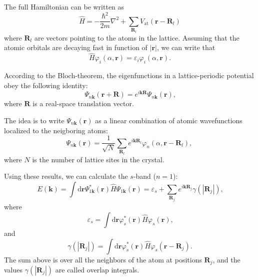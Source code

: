\documentclass[11pt, a4paper, twocolumn]{article}
\newcommand{\bb}[1]{\mathbf{#1}}
\newcommand{\dd}{\mathrm{d}}
\begin{document}
The full Hamiltonian can be written as
\begin{equation*}
  \hat H = -\frac{\hbar^2}{2m} \nabla^2 + \sum\limits_{\bb{R}_l} V_{\textrm{at}} (\bb r - \bb{R}_l)
\end{equation*}
where $\bb{R}_l$ are vectors pointing to the atoms in the lattice. Assuming that the atomic orbitals are
decaying fast in function of $|\bb r|$, we can write that 
\begin{equation*}
  \hat H \varphi_i(\alpha, \bb r) = \varepsilon_i \varphi_i(\alpha, \bb r) \textrm{.}
\end{equation*}

\par According to the Bloch-theorem, the eigenfunctions in a lattice-periodic potential obey the following identity:
\begin{equation*}
  \Psi_{n\bb k}(\bb r + \bb R) = e^{i\bb k \bb R}\Psi_{n\bb k}(\bb r) \text{,}
\end{equation*}
where $\bb R$ is a real-space translation vector. 
\par The idea is to write $\Psi_{n\bb k}(\bb r)$ as a linear combination of atomic wavefunctions localized to the neigboring atoms:
\begin{equation*}
  \Psi_{n\bb k}(\bb r) = \frac{1}{\sqrt N} \sum\limits_{\bb R_l} e^{i\bb k \bb R_l}\varphi_n(\alpha, \bb r - \bb R_l) \textrm{, }
\end{equation*}
where $N$ is the number of lattice sites in the crystal.

\par Using these results, we can calculate the $s$-band ($n=1$):
\begin{equation*}
  E(\bb k) = \int\dd\bb r \Psi_{1\bb k}^{*}(\bb r) \hat H \Psi_{1\bb k}(\bb r) = 
  \varepsilon_s + \sum\limits_{\bb R_j}e^{i\bb k \bb R_j}\gamma(|\bb R_j|) \textrm{,}
\end{equation*} 
where 
\begin{equation*}
  \varepsilon_s = \int\dd\bb r \varphi_{s}^{*}(\bb r) \hat H \varphi_{s}(\bb r) \textrm{,}
\end{equation*}
and 
\begin{equation*}
  \gamma(|\bb R_j|) = \int\dd \bb r \varphi_s^{*}(\bb r)\hat H\varphi_s(\bb r - \bb R_j) \textrm{.}
\end{equation*}
The sum above is over all the neighbors of the atom at positions $\bb R_j$, and 
the values $\gamma (|\bb R_j|)$ are called overlap integrals.
\end{document}
